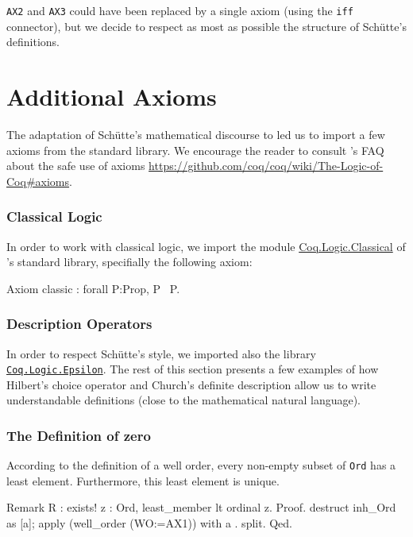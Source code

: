 \texttt{AX2} and \texttt{AX3} could have been replaced by a single axiom (using the \texttt{iff} connector), but we decide to respect as most as possible the structure of Schütte's definitions.

\section{Additional  Axioms}

The adaptation of Schütte's mathematical discourse to \coq{} led us to
import a few axioms from the standard library. We encourage the reader to consult \coq{}'s FAQ about the safe use of axioms
 \url{https://github.com/coq/coq/wiki/The-Logic-of-Coq#axioms}.

\subsubsection{Classical Logic}

In order to work with classical logic, we import the module
\href{https://coq.inria.fr/distrib/current/stdlib/Coq.Logic.Classical.html}{Coq.Logic.Classical}  of \coq{}'s standard library, specifially the following axiom:

\begin{Coqsrc}
 Axiom classic : forall P:Prop, P \/ ~P.
\end{Coqsrc}


\subsubsection{Description Operators}

In order to respect Schütte's style, we imported also the library 
\href{https://coq.inria.fr/distrib/current/stdlib/Coq.Logic.Epsilon.html}{\texttt{Coq.Logic.Epsilon}}.  The rest of this section presents a few examples of
how Hilbert's choice operator and Church's definite description allow us
 to write understandable definitions (close to the mathematical natural language).


\subsubsection{The Definition of zero}

According to the  definition of a well order, every non-empty subset of \texttt{Ord} has a least element. Furthermore, this least element is unique.


\begin{Coqsrc}
Remark R : exists! z : Ord, least_member lt  ordinal z.
Proof.
  destruct inh_Ord as [a]; apply (well_order (WO:=AX1)) with a .
  split.
Qed.
\end{Coqsrc}

